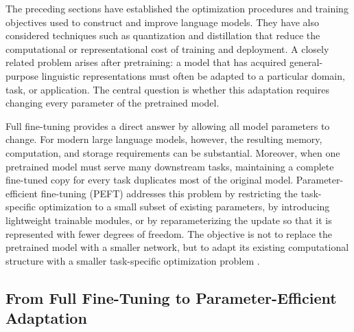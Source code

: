 
The preceding sections have established the optimization procedures and
training objectives used to construct and improve language models. They have
also considered techniques such as quantization and distillation that reduce
the computational or representational cost of training and deployment. A
closely related problem arises after pretraining: a model that has acquired
general-purpose linguistic representations must often be adapted to a
particular domain, task, or application. The central question is whether this
adaptation requires changing every parameter of the pretrained model.

Full fine-tuning provides a direct answer by allowing all model parameters to
change. For modern large language models, however, the resulting memory,
computation, and storage requirements can be substantial. Moreover, when one
pretrained model must serve many downstream tasks, maintaining a complete
fine-tuned copy for every task duplicates most of the original model. Parameter-
efficient fine-tuning (PEFT) addresses this problem by restricting the
task-specific optimization to a small subset of existing parameters, by
introducing lightweight trainable modules, or by reparameterizing the update
so that it is represented with fewer degrees of freedom. The objective is not
to replace the pretrained model with a smaller network, but to adapt its
existing computational structure with a smaller task-specific optimization
problem \parencite{prottasha2025peft,he2025smt}.

\subsection{From Full Fine-Tuning to Parameter-Efficient Adaptation}
\label{subsec:peft-motivation}

